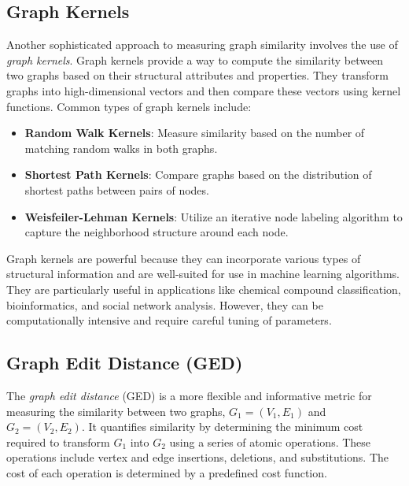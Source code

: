 \documentclass[../Thesis.tex]{subfiles}
\begin{document}
	
	
	\subsection{Graph Kernels}
	
	Another sophisticated approach to measuring graph similarity involves the use of \emph{graph kernels}. Graph kernels provide a way to compute the similarity between two graphs based on their structural attributes and properties. They transform graphs into high-dimensional vectors and then compare these vectors using kernel functions. Common types of graph kernels include:
	
	\begin{itemize}
		\item \textbf{Random Walk Kernels}: Measure similarity based on the number of matching random walks in both graphs.
		\item \textbf{Shortest Path Kernels}: Compare graphs based on the distribution of shortest paths between pairs of nodes.
		\item \textbf{Weisfeiler-Lehman Kernels}: Utilize an iterative node labeling algorithm to capture the neighborhood structure around each node.
	\end{itemize}
	
	Graph kernels are powerful because they can incorporate various types of structural information and are well-suited for use in machine learning algorithms. They are particularly useful in applications like chemical compound classification, bioinformatics, and social network analysis. However, they can be computationally intensive and require careful tuning of parameters.
	
	
	
	\subsection{Graph Edit Distance (GED)}
	
	The \emph{graph edit distance} (GED) is a more flexible and informative metric for measuring the similarity between two graphs, $G_1 = (V_1, E_1)$ and $G_2 = (V_2, E_2)$. It quantifies similarity by determining the minimum cost required to transform $G_1$ into $G_2$ using a series of atomic operations. These operations include vertex and edge insertions, deletions, and substitutions. The cost of each operation is determined by a predefined cost function.
	
\end{document}
